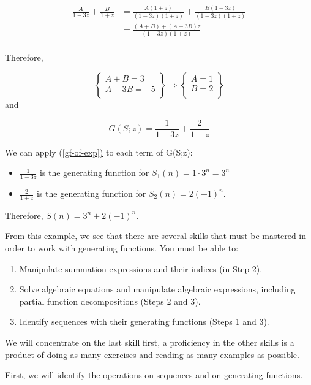 \documentclass[10pt,]{book}
\theoremstyle{plain}
\theoremstyle{definition}
\theoremstyle{definition}
\theoremstyle{definition}
\theoremstyle{definition}
\numberwithin{equation}{section}
\begin{document}
\begin{enumerate}[label=\arabic*]
\begin{equation*}
\begin{split}
\frac{A}{1-3z}+ \frac{B}{1+z} &=\frac{A(1+z)}{(1-3z)(1+z)}+ \frac{B(1-3z)}{(1-3z)(1+z)}\\
		& =\frac{(A+B)+(A-3B)z}{(1-3z)(1+z)}\\
\end{split}
\end{equation*}
%
\par
Therefore,



 \[\left\{
\begin{array}{c}
 A+B=3 \\
 A-3B=-5 \\
\end{array}
\right\}\Rightarrow \left\{
\begin{array}{c}
 A=1 \\
 B=2 \\
\end{array}
\right\}\]
and

\[G(S;z)= \frac{1}{1-3z}+ \frac{2}{1+z}\]

%
\par
We can apply \hyperref[gf-of-exp]{(\ref{gf-of-exp})} to each term of G(S;z):%
\par
%
\begin{itemize}[label=\textbullet]
\item{}\(\frac{1}{1-3z}\) is the generating function for \(S_1(n)=1\cdot  3^n= 3^n\)%
\item{}\(\frac{2}{1+z}\) is the generating function for \(S_2(n)=2(-1)^n\).%
\end{itemize}
%
\par
Therefore, \(S(n)=3^n+ 2(-1)^n\).%
\end{enumerate}
%
\par
From this example, we see that there are several skills that must be mastered in order to work with generating functions. You must be able to:%
\par
\leavevmode%
\begin{enumerate}[label=\alph*]
\item\hypertarget{li-73}{}Manipulate summation expressions and their indices (in Step 2).%
\item\hypertarget{li-74}{}Solve algebraic equations and manipulate algebraic expressions, including partial function decompositions (Steps 2 and 3).%
\item\hypertarget{li-75}{} Identify sequences with their generating functions (Steps 1 and 3).%
\end{enumerate}
%
\par
We will concentrate on the last skill first, a proficiency in the other skills is a product of doing as many exercises and reading as many examples as possible.%
\par
First, we will identify the operations on sequences and on generating functions.%
\typeout{************************************************}
\typeout{************************************************}
\end{document}
